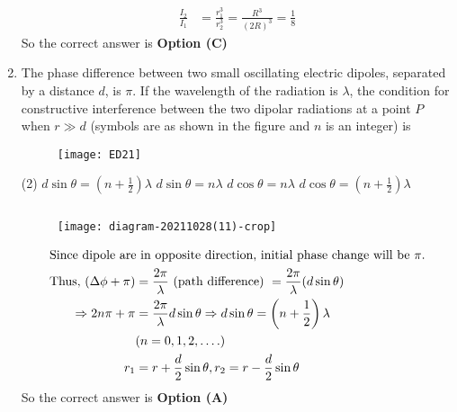 \begin{enumerate}
\begin{tasks}
	\end{tasks}
\begin{answer}
	\begin{align*}
	\frac{I_{2}}{I_{1}}&=\frac{r_{1}^{3}}{r_{2}^{3}}=\frac{R^{3}}{(2 R)^{3}}=\frac{1}{8}
	\end{align*}
	So the correct answer is \textbf{Option (C)}
\end{answer}
	\item  The phase difference between two small oscillating electric dipoles, separated by a distance $d$, is $\pi$. If the wavelength of the radiation is $\lambda$, the condition for constructive interference between the two dipolar radiations at a point $P$ when $r \gg d$ (symbols are as shown in the figure and $n$ is an integer) is
	{}
	\begin{figure}[H]
		\centering
		\texttt{[image: ED21]}
	\end{figure}
	\begin{tasks}(2)
		\task[\textbf{a.}]$d \sin \theta=\left(n+\frac{1}{2}\right) \lambda$
		\task[\textbf{b.}]$d \sin \theta=n \lambda$
		\task[\textbf{c.}] $d \cos \theta=n \lambda$
		\task[\textbf{d.}] $d \cos \theta=\left(n+\frac{1}{2}\right) \lambda$
	\end{tasks}
\begin{answer}$\left. \right. $
	\begin{figure}[H]
		\centering
		\texttt{[image: diagram-20211028(11)-crop]}
	\end{figure}
	\begin{align*}
	\intertext{Since dipole are in opposite direction, initial phase
		change will be $\pi$.}
	\text{Thus, }(\Delta \phi+\pi)&=\frac{2 \pi}{\lambda}\text{ (path difference) }=\frac{2 \pi}{\lambda}(d \sin \theta)\\
	\Rightarrow 2 n \pi+\pi&=\frac{2 \pi}{\lambda} d \sin \theta \Rightarrow d \sin \theta=\left(n+\frac{1}{2}\right) \lambda\\
	&(n=0,1,2, \ldots .)\\
	r_{1}&=r+\frac{d}{2} \sin \theta, r_{2}=r-\frac{d}{2} \sin \theta
	\end{align*}
	So the correct answer is \textbf{Option (A)}
\end{answer}
\end{enumerate}
\setlength\arrayrulewidth{1pt}
